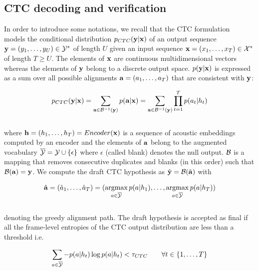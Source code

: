 \documentclass[cameraready]{Interspeech}
\def\argmax{\mathop{\rm argmax}}
\begin{document}
\subsection{CTC decoding and verification}
\label{subsec:CTC}
In order to introduce some notations, we recall that the CTC formulation~\cite{graves2006connectionist} models the conditional distribution $p_{CTC}({\bf y}|{\bf x})$ of an output sequence  ${\bf y}=(y_1,\ldots,y_U)\in{\cal Y}^*$ of length $U$ given an input
sequence ${\bf x}=(x_1,\ldots,x_T)\in{\cal X}^*$ of length $T\ge U$. The
elements of ${\bf x}$ are continuous multidimensional
vectors whereas the elements of ${\bf y}$ belong to a discrete output space. $p({\bf y}|{\bf x})$ is expressed as a
sum over all possible alignments ${\bf a}=(a_1,\ldots,a_{T})$ that
are consistent with ${\bf y}$:

\begin{equation}
p_{CTC}({\bf y}|{\bf x})=\sum_{{\bf a}\in{\cal B}^{-1}({\bf y})}p({\bf a}|{\bf x})=\sum_{{\bf a}\in{\cal B}^{-1}({\bf y})}\prod_{t=1}^T p(a_t|h_t)
\label{ll}
\end{equation}
~~\\
where ${\bf h}=(h_1,\ldots,h_T)=Encoder({\bf x})$ is a sequence of acoustic embeddings computed by an encoder and the elements of ${\bf a}$ belong to the augmented vocabulary
$\overline{{\cal Y}}={\cal Y}\cup\{\epsilon\}$ where $\epsilon$ (called blank) denotes the null output. ${\cal B}$ is a mapping that removes consecutive duplicates and blanks (in this order) such that ${\cal B}({\bf a})={\bf y}$. We compute the draft CTC hypothesis as $\hat{{\bf y}} = {\cal B}(\hat{{\bf a}})$ with

\begin{equation}
\hat{{\bf a}}=(\hat{a}_1,\ldots,\hat{a}_T)=(\argmax_{a\in\overline{{\cal Y}}}p(a|h_1),\ldots,\argmax_{a\in\overline{{\cal Y}}}p(a|h_T))
\end{equation}
~~\\
denoting the greedy alignment path. The draft hypothesis is accepted as final if all the frame-level entropies of the CTC output distribution are less than a threshold i.e.

\begin{equation}
\sum_{a\in\overline{\cal Y}}-p(a|h_t)\log p(a|h_t) < \tau_{CTC}\qquad\forall t\in\{1,\ldots,T\}
\label{eq:CTC-verif}
\end{equation}
\end{document}
